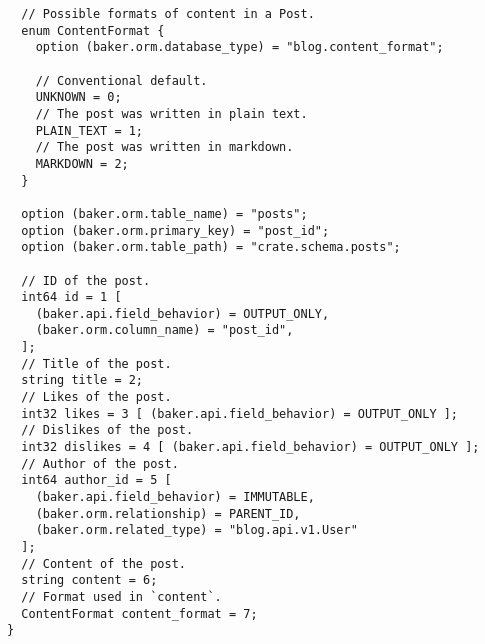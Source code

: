 \begin{verbatim}
  // Possible formats of content in a Post.
  enum ContentFormat {
    option (baker.orm.database_type) = "blog.content_format";

    // Conventional default.
    UNKNOWN = 0;
    // The post was written in plain text.
    PLAIN_TEXT = 1;
    // The post was written in markdown.
    MARKDOWN = 2;
  }

  option (baker.orm.table_name) = "posts";
  option (baker.orm.primary_key) = "post_id";
  option (baker.orm.table_path) = "crate.schema.posts";

  // ID of the post.
  int64 id = 1 [
    (baker.api.field_behavior) = OUTPUT_ONLY,
    (baker.orm.column_name) = "post_id",
  ];
  // Title of the post.
  string title = 2;
  // Likes of the post.
  int32 likes = 3 [ (baker.api.field_behavior) = OUTPUT_ONLY ];
  // Dislikes of the post.
  int32 dislikes = 4 [ (baker.api.field_behavior) = OUTPUT_ONLY ];
  // Author of the post.
  int64 author_id = 5 [
    (baker.api.field_behavior) = IMMUTABLE,
    (baker.orm.relationship) = PARENT_ID,
    (baker.orm.related_type) = "blog.api.v1.User"
  ];
  // Content of the post.
  string content = 6;
  // Format used in `content`.
  ContentFormat content_format = 7;
}
\end{verbatim}
